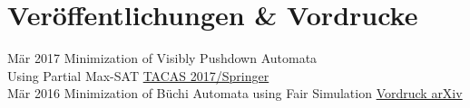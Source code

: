 \documentclass[letterpaper]{twentysecondcv_german} %
\begin{document}
\newpage

\makeprofile %


\section{Veröffentlichungen \& Vordrucke}
\begin{twenty} %
	\twentyitem
    		{Mär 2017}
		{}
        		{Minimization of Visibly Pushdown Automata\\Using Partial Max-SAT}
        		{\href{https://link.springer.com/chapter/10.1007/978-3-662-54577-5_27}{TACAS 2017/Springer}}
        		{}
        		{}\\
        	\twentyitem
    		{Mär 2016}
		{}
        		{Minimization of Büchi Automata using Fair Simulation}
        		{\href{https://arxiv.org/abs/1603.01107}{Vordruck arXiv}}
        		{}
        		{}\\
\end{twenty}

\end{document}
